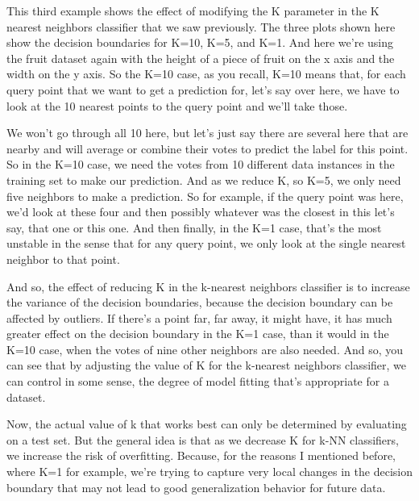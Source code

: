 \begin{multicols}{2}
This third example shows the effect of modifying the K parameter in the K nearest neighbors classifier that we saw previously. The three plots shown here show the decision boundaries for K=10, K=5, and K=1. And here we're using the fruit dataset again with the height of a piece of fruit on the x axis and the width on the y axis. So the K=10 case, as you recall, K=10 means that, for each query point that we want to get a prediction for, let's say over here, we have to look at the 10 nearest points to the query point and we'll take those. 

We won't go through all 10 here, but let's just say there are several here that are nearby and will average or combine their votes to predict the label for this point. So in the K=10 case, we need the votes from 10 different data instances in the training set to make our prediction. And as we reduce K, so K=5, we only need five neighbors to make a prediction. So for example, if the query point was here, we'd look at these four and then possibly whatever was the closest in this let's say, that one or this one. And then finally, in the K=1 case, that's the most unstable in the sense that for any query point, we only look at the single nearest neighbor to that point. 

And so, the effect of reducing K in the k-nearest neighbors classifier is to increase the variance of the decision boundaries, because the decision boundary can be affected by outliers. If there's a point far, far away, it might have, it has much greater effect on the decision boundary in the K=1 case, than it would in the K=10 case, when the votes of nine other neighbors are also needed. And so, you can see that by adjusting the value of K for the k-nearest neighbors classifier, we can control in some sense, the degree of model fitting that's appropriate for a dataset. 

Now, the actual value of k that works best can only be determined by evaluating on a test set. But the general idea is that as we decrease K for k-NN classifiers, we increase the risk of overfitting. Because, for the reasons I mentioned before, where K=1 for example, we're trying to capture very local changes in the decision boundary that may not lead to good generalization behavior for future data. 

\end{multicols}